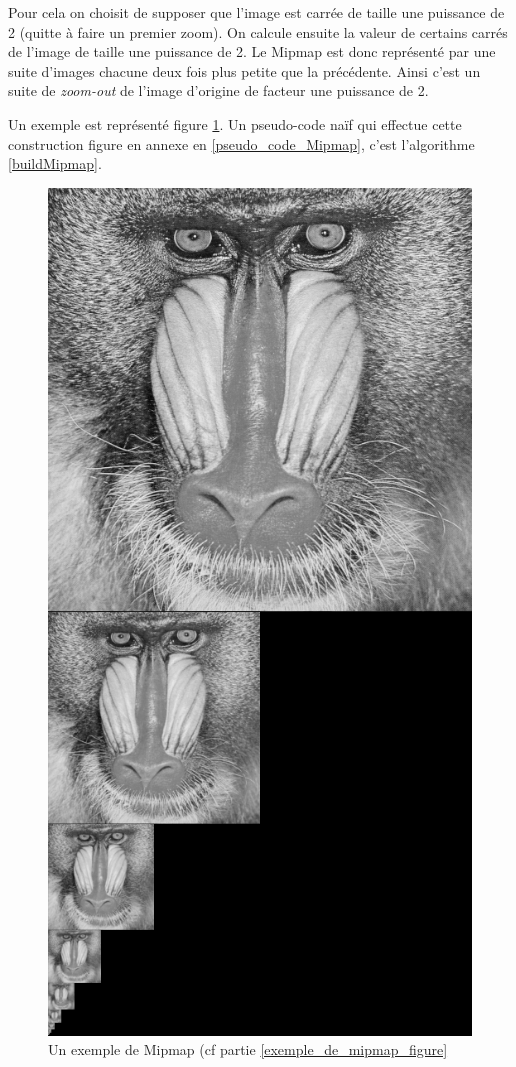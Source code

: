 Pour cela on choisit de supposer que l'image est carrée de taille une puissance de 2 (quitte à faire un premier zoom). On calcule ensuite la valeur de certains carrés de l'image de taille une puissance de 2.
Le Mipmap est donc représenté par une suite d'images chacune deux fois plus petite que la précédente. Ainsi c'est un suite de \emph{zoom-out} de l'image d'origine de facteur une puissance de 2. 

Un exemple est représenté figure \ref{MipMap_real}. Un pseudo-code naïf qui effectue cette construction figure en annexe en \ref{pseudo_code_Mipmap}, c'est l'algorithme \ref{buildMipmap}.
\label{exemple_de_mipmap_figure}
\begin{figure}[h!]
\centering
\includegraphics[scale=0.4]{MipMap_real} %
\caption{Un exemple de Mipmap (cf partie \ref{exemple_de_mipmap_figure}}
\label{MipMap_real}
\end{figure}

